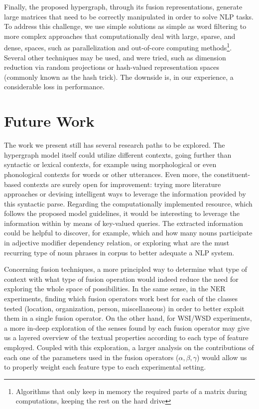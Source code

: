 Finally, the proposed hypergraph, through its fusion representations, generate large matrices that need to be correctly manipulated in order to solve NLP tasks. To address this challenge, we use simple solutions as simple as word filtering to more complex approaches that computationally deal with large, sparse, and dense, spaces, such as parallelization and out-of-core computing methods\footnote{Algorithms that only keep in memory the required parts of a matrix during computations, keeping the rest on the hard drive}. Several other techniques may be used, and were tried, such as dimension reduction via random projections or hash-valued  representation spaces (commonly known as the hash trick). The downside is, in our experience, a considerable loss in performance.


\section{Future Work}
The work we present still has several research paths to be explored.
The hypergraph model itself could utilize different contexts, going further than syntactic or lexical contexts, for example using morphological or even phonological contexts for words or other utterances. Even more, the constituent-based contexts are surely open for improvement: trying more literature approaches or devising intelligent ways to leverage the information provided by this syntactic parse.  Regarding the computationally implemented resource, which follows the proposed model guidelines, it would be interesting to leverage the information within by means of key-valued queries. The extracted information could be helpful to discover, for example, which and how many nouns participate in adjective modifier dependency relation, or exploring what are the must recurring type of noun phrases in corpus to better adequate a NLP system.


Concerning fusion techniques, a more principled way to determine what type of context with what type of fusion operation would indeed reduce the need for exploring the whole space of possibilities. In the same sense, in the NER experiments, finding which fusion operators work best for each of the classes tested (location, organization, person, miscellaneous) in order to better exploit them in a single fusion operator. On the other hand, for WSI/WSD experiments, a more in-deep exploration of the senses found by each fusion operator may give us a layered overview of the textual properties according to each type of feature employed. Coupled with this exploration, a larger analysis on the contributions of each one of the parameters used in the fusion operators ($\alpha, \beta, \gamma$) would allow us to properly weight each feature type to each experimental setting.

